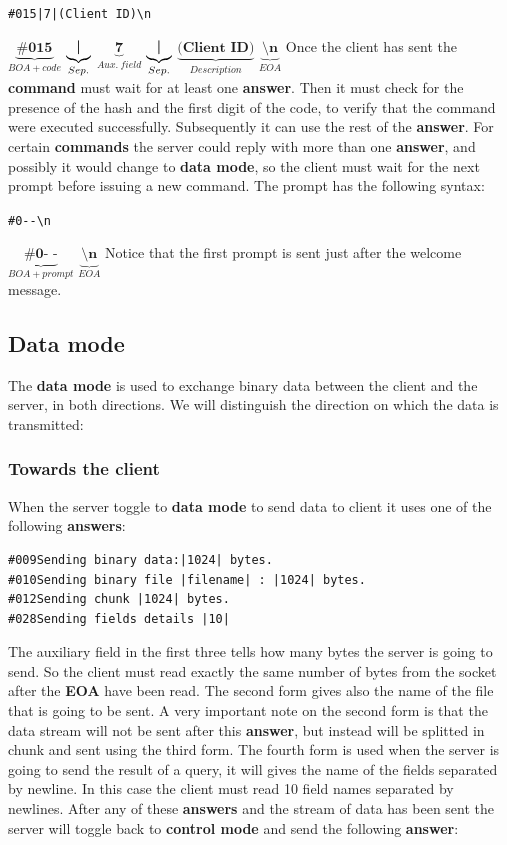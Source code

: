 \documentclass[12pt,titlepage]{book}
\begin{document}
\bigskip
\verb!#015|7|(Client ID)\n!

\bigskip
$\underbrace{\textbf{\#015}}_{BOA + code}$
$\underbrace{\textbf{\textbar}}_{Sep.}$
$\underbrace{\textbf{7}}_{Aux.\ field}$
$\underbrace{\textbf{\textbar}}_{Sep.}$
$\underbrace{\textbf{(Client ID)}}_{Description}$
$\underbrace{\textbf{\textbackslash n}}_{EOA}$
\bigskip \newline
%
Once the client has sent the \textbf{command} must wait for at least
one \textbf{answer}. Then it must check for the presence of the hash
and the first digit of the code, to verify that the command were
executed successfully. Subsequently it can use the rest of the
\textbf{answer}. For certain \textbf{commands} the server could reply
with more than one \textbf{answer}, and possibly it would change to
\textbf{data mode}, so the client must wait for the next prompt before
issuing a new command. The prompt has the following syntax:

\bigskip
\verb!#0--\n!

\bigskip
$\underbrace{\textbf{\#0- -}}_{BOA + prompt}$
$\underbrace{\textbf{\textbackslash n}}_{EOA}$
\bigskip \newline
%
Notice that the first prompt is sent just after the welcome message.



\subsection{Data mode}
The \textbf{data mode} is used to exchange binary data between the
client and the server, in both directions. We will distinguish the
direction on which the data is transmitted:

\subsubsection{Towards the client}
When the server toggle to \textbf{data mode} to send data to client it
uses one of the following \textbf{answers}:

\begin{verbatim}
#009Sending binary data:|1024| bytes.
#010Sending binary file |filename| : |1024| bytes.
#012Sending chunk |1024| bytes.
#028Sending fields details |10|
\end{verbatim}
%
The auxiliary field in the first three tells how many bytes the server
is going to send. So the client must read exactly the same number of
bytes from the socket after the \textbf{EOA} have been read. The
second form gives also the name of the file that is going to be
sent. A very important note on the second form is that the data stream
will not be sent after this \textbf{answer}, but instead will be
splitted in chunk and sent using the third form. The fourth form is
used when the server is going to send the result of a query, it will
gives the name of the fields separated by newline. In this case the
client must read 10 field names separated by newlines. After any of
these \textbf{answers} and the stream of data has been sent the server
will toggle back to \textbf{control mode} and send the following
\textbf{answer}:
\end{document}
